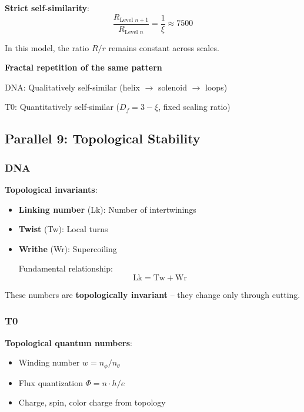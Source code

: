 	\textbf{Strict self-similarity}:
	\begin{equation}
		\frac{R_{\text{Level } n+1}}{R_{\text{Level } n}} = \frac{1}{\xi} \approx 7500
	\end{equation}

	In this model, the ratio $R/r$ remains constant across scales.

	\begin{keyresult}
		\textbf{Fractal repetition of the same pattern}

		DNA: Qualitatively self-similar (helix $\to$ solenoid $\to$ loops)

		T0: Quantitatively self-similar ($D_f = 3-\xi$, fixed scaling ratio)
	\end{keyresult}

	\subsection{Parallel 9: Topological Stability}

	\subsubsection{DNA}

	\textbf{Topological invariants}:

	\begin{itemize}
		\item \textbf{Linking number} (Lk): Number of intertwinings
		\item \textbf{Twist} (Tw): Local turns
		\item \textbf{Writhe} (Wr): Supercoiling

		Fundamental relationship:
		\begin{equation}
			\text{Lk} = \text{Tw} + \text{Wr}
		\end{equation}
	\end{itemize}

	These numbers are \textbf{topologically invariant} -- they change only through cutting.

	\subsubsection{T0}

	\textbf{Topological quantum numbers}:
	\begin{itemize}
		\item Winding number $w = n_\phi / n_\theta$
		\item Flux quantization $\Phi = n \cdot h/e$
		\item Charge, spin, color charge from topology
	\end{itemize}

